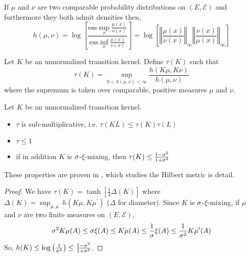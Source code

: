\begin{proposition} If $\mu$ and $\nu$ are two comparable probability distributions on $(E, \mathcal E)$ and furthermore they both admit densities then,
\begin{equation}
h(\mu, \nu)=\log\left[\frac{\textrm{ess}\sup_x \frac{\mu(x)}{\nu(x)}}{\textrm{ess}\inf_x\frac{\mu(x)}{\nu(x)}}\right] = \log \left[\left\Vert\frac{\mu(x)}{\nu(x)}\right\Vert_\infty\left\Vert\frac{\nu(x)}{\mu(x)}\right\Vert_\infty\right]
\end{equation}
\end{proposition}

\begin{definition}
Let $K$ be an unnormalized transition kernel. Define $\tau(K)$ such that
\begin{equation}
    \tau(K) = \sup_{0 < h(\mu, \nu) < \infty} \frac{h(K\mu, K\nu)}{h(\mu, \nu)}
\end{equation}
where the supremum is taken over comparable, positive measures $\mu$ and $\nu$.
\end{definition}

\begin{proposition}\label{prop:hilbert}
Let $K$ be an unnormalized transition kernel.
\begin{itemize}
    \item $\tau$ is sub-multiplicative, i.e. $\tau(KL)\leq \tau(K)\tau(L)$
    \item $\tau \leq 1$
    \item if in addition $K$ is $\sigma$-$\xi$-mixing, then $\tau(K) \leq \frac{1- \sigma^2}{1 + \sigma^2}$
\end{itemize}
\end{proposition}

These properties are proven in \cite{cohen}, which studies the Hilbert metric is detail.

\begin{proof} We have $\tau(K) = \tanh\left[\frac{1}{4}\Delta(K)\right]$ where $\Delta(K) = \sup_{\mu, \mu^\prime}h(K\mu, K\mu^\prime)$ ($\Delta$ for diameter). Since $K$ is $\sigma$-$\xi$-mixing, if $\mu$ and $\nu$ are two finite measures on $(E, \mathcal E)$,
\begin{equation}
    \sigma^2K\mu(A)\leq\sigma\xi(A)\leq K\mu(A)\leq \frac{1}{\sigma}\xi(A) \leq \frac{1}{\sigma^2}K\mu^\prime(A)
\end{equation}
   So, $h(K) \leq \log\left(\frac{1}{\sigma^4}\right)\leq \frac{1 - \sigma^2}{1 + \sigma^2}$.
\end{proof}


